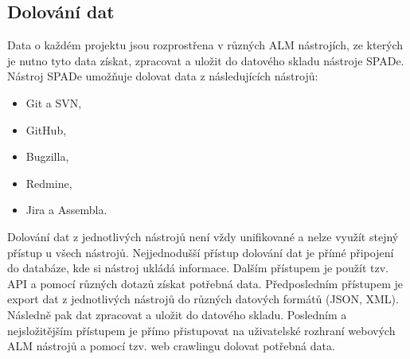 \documentclass[czech,DP]{thesiskiv}
\begin{document}
\subsection{Dolování dat}\label{sec:datamining}
Data o každém projektu jsou rozprostřena v různých ALM nástrojích, ze kterých je nutno tyto data získat, zpracovat a uložit do datového skladu nástroje SPADe. Nástroj SPADe umožňuje dolovat data z následujících nástrojů:
\begin{itemize}
    \item Git a SVN,
    \item GitHub,
    \item Bugzilla,
    \item Redmine,
    \item Jira a Assembla.\cite{picha}
\end{itemize}
Dolování dat z jednotlivých nástrojů není vždy unifikované a nelze využít stejný přístup u všech nástrojů. Nejjednodušší přístup dolování dat je přímé připojení do databáze, kde si nástroj ukládá informace. Dalším přístupem je použít tzv. API a pomocí různých dotazů získat potřebná data. Předposledním přístupem je export dat z jednotlivých nástrojů do různých datových formátů (JSON, XML). Následně pak dat zpracovat a uložit do datového skladu. Posledním a nejsložitějším přístupem je přímo přistupovat na uživatelské rozhraní webových ALM nástrojů a pomocí tzv. web crawlingu dolovat potřebná data.\cite{picha}
\end{document}
